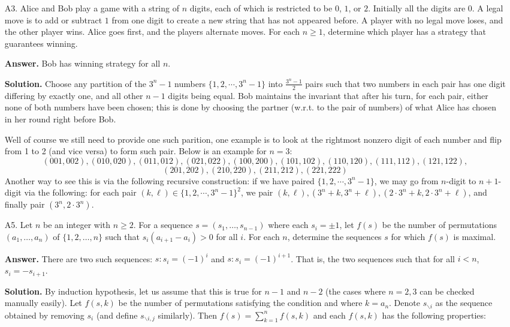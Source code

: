 \documentclass[11pt,a4paper]{article}
\begin{document}
\begin{enumerate}
		\item [A3.] 
		Alice and Bob play a game with a string of $n$ digits, each of which is restricted to be $0$, $1$, or $2$. Initially all the digits are $0$. A legal move is to add or subtract $1$ from one digit to create a new string that has not appeared before. A player with no legal move loses, and the other player wins. Alice goes first, and the players alternate moves. For each $n \geq 1$, determine which player has a strategy that guarantees winning.
		
		\textbf{Answer.} Bob has winning strategy for all $n$. 
		
		\textbf{Solution.} Choose any partition of the $3^n-1$ numbers $\{1, 2, \cdots, 3^n-1\}$ into $\frac{3^n-1}{2}$ pairs such that two numbers in each pair has one digit differing by exactly one, and all other $n-1$ digits being equal. 
		Bob maintains the invariant that after his turn, for each pair, either none of both numbers have been chosen; 
		this is done by choosing the partner (w.r.t. to the pair of numbers) of what Alice has chosen in her round right before Bob. 
		
		Well of course we still need to provide one such parition, one example is to look at the rightmost nonzero digit of each number and flip from 1 to 2 (and vice versa) to form such pair. Below is an example for $n=3$: 
		\[
		(001, 002), (010, 020), (011, 012), (021, 022), 
		(100, 200), (101, 102), (110, 120), (111, 112), (121, 122), 
		\]\[
		(201, 202), (210, 220), (211, 212), (221, 222)
		\]
		Another way to see this is via the following recursive construction: if we have paired $\{1, 2, \cdots, 3^n-1\}$, 
		we may go from $n$-digit to $n+1$-digit via the following: 
		for each pair $(k, \ell)\in \{1, 2, \cdots, 3^n-1\}^2$, we pair $(k, \ell), (3^n+k, 3^n+\ell), (2\cdot 3^n+k, 2\cdot 3^n+\ell)$, and finally pair $(3^n, 2\cdot 3^n)$. 
		
		\item [A5.]
		Let $n$ be an integer with $n \ge 2$. For a sequence $s=(s_1,\dots,s_{n-1})$ where each $s_i=\pm 1$, let $f(s)$ be the number of permutations $(a_1,\dots,a_n)$ of $\{1,2,\dots,n\}$ such that $s_i(a_{i+1}-a_i)>0$ for all $i$. For each $n$, determine the sequences $s$ for which $f(s)$ is maximal.
		
		\textbf{Answer.} There are two such sequences: $s: s_i = (-1)^i$ and $s: s_i =(-1)^{i+1}$. That is, 
		the two sequences such that for all $i < n$, $s_i=-s_{i+1}$. 
		
		\textbf{Solution.} By induction hypothesis, let us assume that this is true for $n-1$ and $n-2$ (the cases where $n=2, 3$ can be checked manually easily). Let $f(s, k)$ be the number of permutations satisfying the condition and where $k=a_n$. Denote $s_{\backslash i}$ as the sequence obtained by removing $s_i$ (and define $s_{\backslash i, j}$ similarly). Then $f(s)=\sum_{k=1}^n f(s, k)$ and each $f(s, k)$ has the following properties:
		

\end{enumerate}
\end{document}
